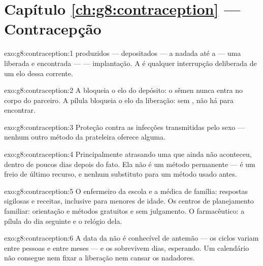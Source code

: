 \section*{Capítulo \ref{ch:g8:contraception} --- Contracepção}

\begin{solution}{exo:g8:contraception:1}
 produzidos ---  depositados --- a nadada até a
 --- uma  liberada e encontrada
---  --- implantação. A  é qualquer interrupção
deliberada de um elo dessa corrente.
\end{solution}

\begin{solution}{exo:g8:contraception:2}
A  bloqueia o elo do depósito: o sêmen nunca entra no corpo
do parceiro. A pílula bloqueia o elo da liberação: sem , não há
 para encontrar.
\end{solution}

\begin{solution}{exo:g8:contraception:3}
Proteção contra as infecções transmitidas pelo sexo --- nenhum outro
método da prateleira oferece alguma.
\end{solution}

\begin{solution}{exo:g8:contraception:4}
Principalmente atrasando uma  que ainda não aconteceu, dentro
de poucos dias depois do fato. Ela não é um método permanente --- é um
freio de último recurso, e nenhum substituto para um método usado
antes.
\end{solution}

\begin{solution}{exo:g8:contraception:5}
O enfermeiro da escola e a médica de família: respostas sigilosas e
receitas, inclusive para menores de idade. Os centros de planejamento
familiar: orientação e métodos gratuitos e sem julgamento. O
farmacêutico: a pílula do dia seguinte e o relógio dela.
\end{solution}

\begin{solution}{exo:g8:contraception:6}
A data da  não é conhecível de antemão --- os ciclos variam
entre pessoas e entre meses --- e os  sobrevivem dias,
esperando. Um calendário não consegue nem fixar a liberação nem cansar
os nadadores.
\end{solution}

